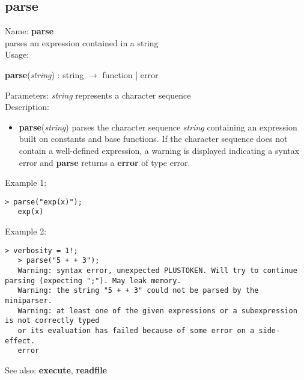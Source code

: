\subsection{ parse }
\noindent Name: \textbf{parse}\\
parses an expression contained in a string\\

\noindent Usage: 
\begin{center}
\textbf{parse}(\emph{string}) : \textsf{string} $\rightarrow$ \textsf{function} | \textsf{error}\\
\end{center}
Parameters: 
\emph{string} represents a character sequence\\

\noindent Description: \begin{itemize}

\item \textbf{parse}(\emph{string}) parses the character sequence \emph{string} containing
   an expression built on constants and base functions.
   If the character sequence does not contain a well-defined expression,
   a warning is displayed indicating a syntax error and \textbf{parse} returns
   a \textbf{error} of type \textsf{error}.
\end{itemize}
\noindent Example 1: 
\begin{center}\begin{minipage}{14.8cm}\begin{Verbatim}[frame=single]
   > parse("exp(x)");
   exp(x)
\end{Verbatim}
\end{minipage}\end{center}
\noindent Example 2: 
\begin{center}\begin{minipage}{14.8cm}\begin{Verbatim}[frame=single]
   > verbosity = 1!;
   > parse("5 + + 3");
   Warning: syntax error, unexpected PLUSTOKEN. Will try to continue parsing (expecting ";"). May leak memory.
   Warning: the string "5 + + 3" could not be parsed by the miniparser.
   Warning: at least one of the given expressions or a subexpression is not correctly typed
   or its evaluation has failed because of some error on a side-effect.
   error
\end{Verbatim}
\end{minipage}\end{center}
See also: \textbf{execute}, \textbf{readfile}

